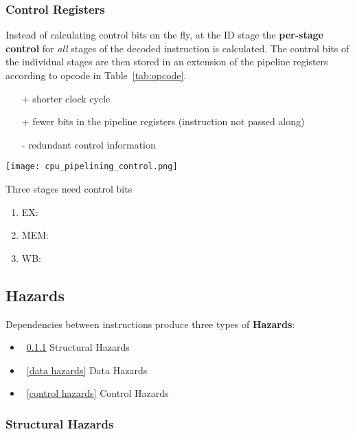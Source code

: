 \subsubsection{Control Registers}
Instead of calculating control bits on the fly, at the ID stage the \textbf{per-stage control} for \textit{all} stages of the decoded instruction is calculated.
The control bits of the individual stages are then stored in an extension of the pipeline registers according to opcode in Table~\ref{tab:opcode}.
\begin{itemize}
    \item[+] shorter clock cycle
    \item[+] fewer bits in the pipeline registers (instruction not passed along)
    \item[-] redundant control information
\end{itemize}

\begin{center}
    \texttt{[image: cpu\_pipelining\_control.png]}
\end{center}

Three stages need control bits
\begin{enumerate}
    \item EX: 
    \item MEM: 
    \item WB: 
\end{enumerate}

\subsection{Hazards}
Dependencies between instructions produce three types of \textbf{Hazards}:
\begin{itemize}
    \item~\ref{structural hazards} Structural Hazards
    \item~\ref{data hazards} Data Hazards
    \item~\ref{control hazards} Control Hazards
\end{itemize}

\subsubsection{Structural Hazards}\label{structural hazards}

